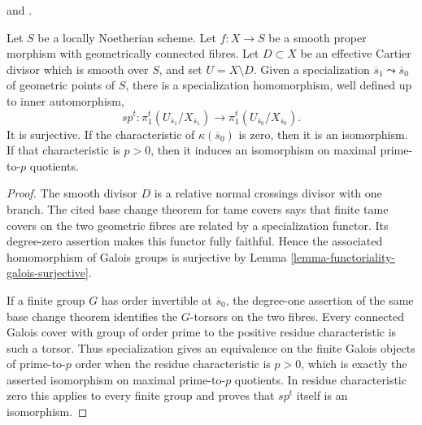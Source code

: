 \begin{theorem}
\label{theorem-tame-specialization}
\begin{reference}
\cite[Expos\'e 182, Th\'eor\`eme 14, p. 219]{FGA} and
\cite[Expos\'e XIII, Corollaire 2.9 and Section 2.10]{SGA1}.
\end{reference}
Let $S$ be a locally Noetherian scheme. Let $f : X \to S$ be a smooth
proper morphism with geometrically connected fibres. Let $D \subset X$ be
an effective Cartier divisor which is smooth over $S$, and set
$U = X \setminus D$. Given a specialization
$\overline{s}_1 \leadsto \overline{s}_0$ of geometric points of $S$, there
is a specialization homomorphism, well defined up to inner automorphism,
$$
sp^t :
\pi_1^t(U_{\overline{s}_1}/X_{\overline{s}_1})
\longrightarrow
\pi_1^t(U_{\overline{s}_0}/X_{\overline{s}_0}).
$$
It is surjective. If the characteristic of $\kappa(\overline{s}_0)$ is zero,
then it is an isomorphism. If that characteristic is $p > 0$, then it induces
an isomorphism on maximal prime-to-$p$ quotients.
\end{theorem}

\begin{proof}
The smooth divisor $D$ is a relative normal crossings divisor with one
branch. The cited base change theorem for tame covers says that finite tame
covers on the two geometric fibres are related by a specialization functor.
Its degree-zero assertion makes this functor fully faithful. Hence the
associated homomorphism of Galois groups is surjective by
Lemma \ref{lemma-functoriality-galois-surjective}.

If a finite group $G$ has order invertible at $\overline{s}_0$, the
degree-one assertion of the same base change theorem identifies the
$G$-torsors on the two fibres. Every connected Galois cover with group of
order prime to the positive residue characteristic is such a torsor. Thus
specialization gives an equivalence on the finite Galois objects of
prime-to-$p$ order when the residue characteristic is $p > 0$, which is
exactly the asserted isomorphism on maximal prime-to-$p$ quotients. In residue
characteristic zero this applies to every finite group and proves that
$sp^t$ itself is an isomorphism.
\end{proof}

